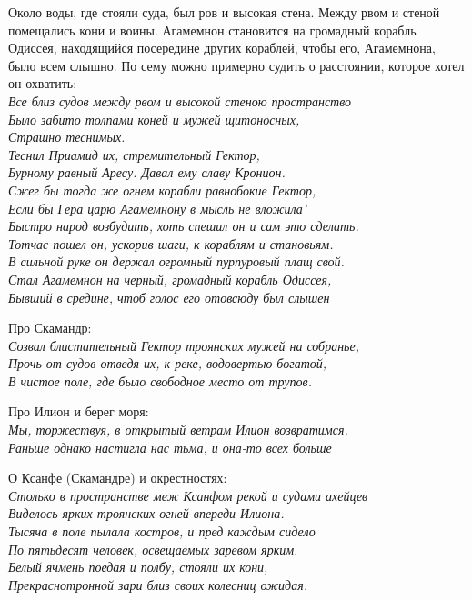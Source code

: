Около воды, где стояли суда, был ров и высокая стена. Между рвом и стеной помещались кони и воины. Агамемнон становится на громадный корабль Одиссея, находящийся посередине других кораблей, чтобы его, Агамемнона, было всем слышно. По сему можно примерно судить о расстоянии, которое хотел он охватить:\\

\noindent
\textit{Все близ судов между рвом и высокой стеною пространство\\
Было забито толпами коней и мужей щитоносных,\\
Страшно теснимых.\\ 
Теснил Приамид их, стремительный Гектор,\\
Бурному равный Аресу. Давал ему славу Кронион.\\
Сжег бы тогда же огнем корабли равнобокие Гектор,\\
Если бы Гера царю Агамемнону в мысль не вложила'\\
Быстро народ возбудить, хоть спешил он и сам это сделать.\\
Тотчас пошел он, ускорив шаги, к кораблям и становьям.\\
В сильной руке он держал огромный пурпуровый плащ свой.\\
Стал Агамемнон на черный, громадный корабль Одиссея,\\
Бывший в средине, чтоб голос его отовсюду был слышен\\}

Про Скамандр:\\

\noindent
\textit{Созвал блистательный Гектор троянских мужей на собранье,\\
Прочь от судов отведя их, к реке, водовертью богатой,\\
В чистое поле, где было свободное место от трупов.\\}

Про Илион и берег моря:\\

\noindent
\textit{Мы, торжествуя, в открытый ветрам Илион возвратимся.\\
Раньше однако настигла нас тьма, и она-то всех больше\\}

О Ксанфе (Скамандре) и окрестностях:\\

\noindent
\textit{Столько в пространстве меж Ксанфом рекой и судами ахейцев\\
Виделось ярких троянских огней впереди Илиона.\\
Тысяча в поле пылала костров, и пред каждым сидело\\
По пятьдесят человек, освещаемых заревом ярким.\\
Белый ячмень поедая и полбу, стояли их кони,\\
Прекраснотронной зари близ своих колесниц ожидая.\\}

